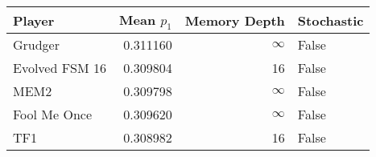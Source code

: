 \begin{tabular}{lrrl}
\toprule
         Player &  Mean $p_1$ &  Memory Depth & Stochastic \\
\midrule
        Grudger &    0.311160 &            \(\infty\) &      False \\
 Evolved FSM 16 &    0.309804 &            16 &      False \\
           MEM2 &    0.309798 &            \(\infty\) &      False \\
   Fool Me Once &    0.309620 &            \(\infty\) &      False \\
            TF1 &    0.308982 &            16 &      False \\
\bottomrule
\end{tabular}
